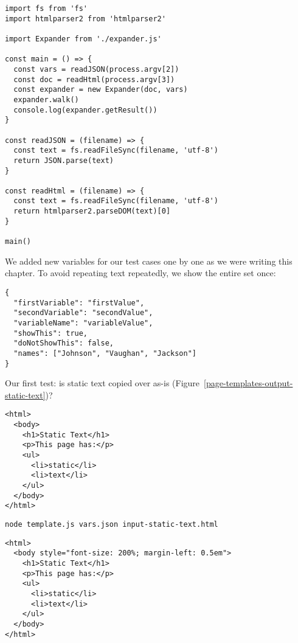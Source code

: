 \documentclass[krantzl]{krantz}
\newcommand{\figref}[1]{Figure~\ref{#1}}
\begin{document}
\begin{lstlisting}[frame=single,frameround=tttt]
import fs from 'fs'
import htmlparser2 from 'htmlparser2'

import Expander from './expander.js'

const main = () => {
  const vars = readJSON(process.argv[2])
  const doc = readHtml(process.argv[3])
  const expander = new Expander(doc, vars)
  expander.walk()
  console.log(expander.getResult())
}

const readJSON = (filename) => {
  const text = fs.readFileSync(filename, 'utf-8')
  return JSON.parse(text)
}

const readHtml = (filename) => {
  const text = fs.readFileSync(filename, 'utf-8')
  return htmlparser2.parseDOM(text)[0]
}

main()
\end{lstlisting}



We added new variables for our test cases one by one
as we were writing this chapter.
To avoid repeating text repeatedly,
we show the entire set once:


\begin{lstlisting}[frame=single,frameround=tttt]
{
  "firstVariable": "firstValue",
  "secondVariable": "secondValue",
  "variableName": "variableValue",
  "showThis": true,
  "doNotShowThis": false,
  "names": ["Johnson", "Vaughan", "Jackson"]
}
\end{lstlisting}



Our first test:
is static text copied over as-is (\figref{page-templates-output-static-text})?


\begin{lstlisting}[frame=single,frameround=tttt]
<html>
  <body>
    <h1>Static Text</h1>
    <p>This page has:</p>
    <ul>
      <li>static</li>
      <li>text</li>
    </ul>
  </body>
</html>
\end{lstlisting}



\begin{lstlisting}[frame=single,frameround=tttt]
node template.js vars.json input-static-text.html
\end{lstlisting}



\begin{lstlisting}[frame=single,frameround=tttt]
<html>
  <body style="font-size: 200%; margin-left: 0.5em">
    <h1>Static Text</h1>
    <p>This page has:</p>
    <ul>
      <li>static</li>
      <li>text</li>
    </ul>
  </body>
</html>
\end{lstlisting}
\end{document}
